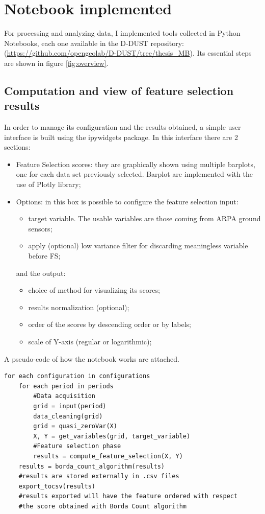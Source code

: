 \section{Notebook implemented}
For processing and analyzing data, I implemented tools collected in Python Notebooks, each one available in the D-DUST repository:
(\url{https://github.com/opengeolab/D-DUST/tree/thesis_MB}).\newline
Its essential steps are shown in figure \ref{fig:overview}.

\subsection{Computation and view of feature selection results}
In order to manage its configuration and the results obtained, a simple user interface is built using the ipywidgets package.
In this interface there are 2 sections:
\begin{itemize}
\item Feature Selection scores: they are graphically shown using multiple barplots, one for each data set previously selected. Barplot are implemented with the use of Plotly library; 
\item Options: in this box is possible to configure the feature selection input:
\begin{itemize}
\item target variable. The usable variables are those coming from ARPA ground sensors;
\item apply (optional) low variance filter for discarding meaningless variable before FS;
\end{itemize}
and the output:
\begin{itemize}
\item choice of method for visualizing its scores;
\item results normalization (optional);
\item order of the scores by descending order or by labels;
\item scale of Y-axis (regular or logarithmic);
\end{itemize}
\end{itemize}
A pseudo-code of how the notebook works are attached.
\begin{verbatim}
for each configuration in configurations
    for each period in periods
        #Data acquisition
        grid = input(period)
        data_cleaning(grid)
        grid = quasi_zeroVar(X)
        X, Y = get_variables(grid, target_variable)
        #Feature selection phase
        results = compute_feature_selection(X, Y)
    results = borda_count_algorithm(results)
    #results are stored externally in .csv files
    export_tocsv(results) 
    #results exported will have the feature ordered with respect
    #the score obtained with Borda Count algorithm
\end{verbatim}
